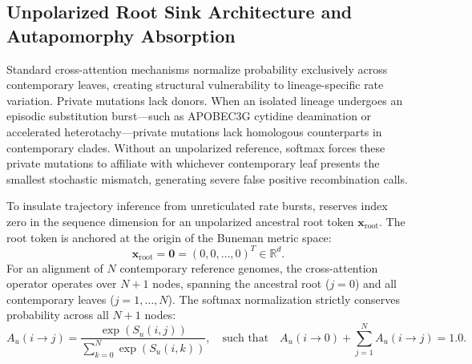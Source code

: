 \subsection{Unpolarized Root Sink Architecture and Autapomorphy Absorption}
\label{subsec:methods_root_sink}

Standard cross-attention mechanisms normalize probability exclusively across contemporary leaves, creating structural vulnerability to lineage-specific rate variation.
Private mutations lack donors.
When an isolated lineage undergoes an episodic substitution burst---such as APOBEC3G cytidine deamination or accelerated heterotachy---private mutations lack homologous counterparts in contemporary clades.
Without an unpolarized reference, softmax forces these private mutations to affiliate with whichever contemporary leaf presents the smallest stochastic mismatch, generating severe false positive recombination calls.

To insulate trajectory inference from unreticulated rate bursts, \RhizAeon reserves index zero in the sequence dimension for an unpolarized ancestral root token $\mathbf{x}_{\text{root}}$.
The root token is anchored at the origin of the Buneman metric space:
\begin{equation}
\mathbf{x}_{\text{root}} = \mathbf{0} = (0, 0, \dots, 0)^T \in \mathbb{R}^d.
\label{eq:methods_root_anchor}
\end{equation}
For an alignment of $N$ contemporary reference genomes, the cross-attention operator operates over $N+1$ nodes, spanning the ancestral root ($j=0$) and all contemporary leaves ($j=1, \dots, N$).
The softmax normalization strictly conserves probability across all $N+1$ nodes:
\begin{equation}
A_u(i \to j) = \frac{\exp(S_u(i, j))}{\sum_{k=0}^N \exp(S_u(i, k))}, \quad \text{such that} \quad A_u(i \to 0) + \sum_{j=1}^N A_u(i \to j) = 1.0.
\label{eq:methods_root_softmax}
\end{equation}


